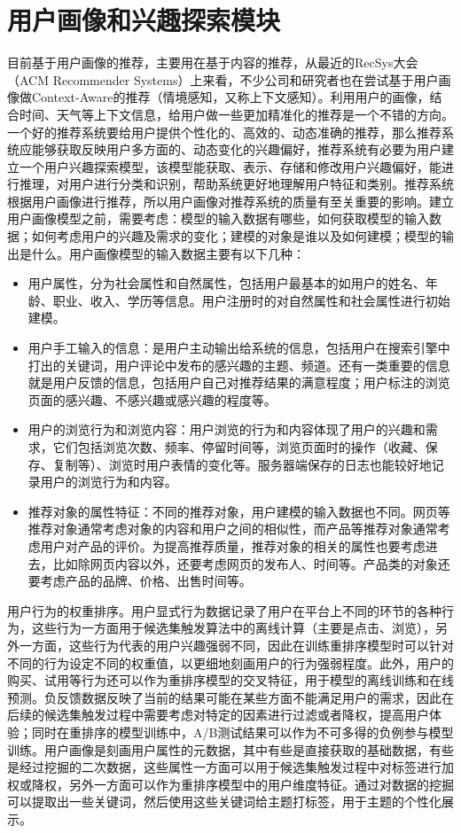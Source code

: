   \section{用户画像和兴趣探索模块}
  目前基于用户画像的推荐，主要用在基于内容的推荐，从最近的RecSys大会（ACM Recommender Systems）上来看，不少公司和研究者也在尝试基于用户画像做Context-Aware的推荐（情境感知，又称上下文感知）。利用用户的画像，结合时间、天气等上下文信息，给用户做一些更加精准化的推荐是一个不错的方向。一个好的推荐系统要给用户提供个性化的、高效的、动态准确的推荐，那么推荐系统应能够获取反映用户多方面的、动态变化的兴趣偏好，推荐系统有必要为用户建立一个用户兴趣探索模型，该模型能获取、表示、存储和修改用户兴趣偏好，能进行推理，对用户进行分类和识别，帮助系统更好地理解用户特征和类别。推荐系统根据用户画像进行推荐，所以用户画像对推荐系统的质量有至关重要的影响。建立用户画像模型之前，需要考虑：模型的输入数据有哪些，如何获取模型的输入数据；如何考虑用户的兴趣及需求的变化；建模的对象是谁以及如何建模；模型的输出是什么。用户画像模型的输入数据主要有以下几种：
  \begin{itemize}
  \item 用户属性，分为社会属性和自然属性，包括用户最基本的如用户的姓名、年龄、职业、收入、学历等信息。用户注册时的对自然属性和社会属性进行初始建模。 
  \item 用户手工输入的信息：是用户主动输出给系统的信息，包括用户在搜索引擎中打出的关键词，用户评论中发布的感兴趣的主题、频道。还有一类重要的信息就是用户反馈的信息，包括用户自己对推荐结果的满意程度；用户标注的浏览页面的感兴趣、不感兴趣或感兴趣的程度等。
  \item 用户的浏览行为和浏览内容：用户浏览的行为和内容体现了用户的兴趣和需求，它们包括浏览次数、频率、停留时间等，浏览页面时的操作（收藏、保存、复制等）、浏览时用户表情的变化等。服务器端保存的日志也能较好地记录用户的浏览行为和内容。
  \item 推荐对象的属性特征：不同的推荐对象，用户建模的输入数据也不同。网页等推荐对象通常考虑对象的内容和用户之间的相似性，而产品等推荐对象通常考虑用户对产品的评价。为提高推荐质量，推荐对象的相关的属性也要考虑进去，比如除网页内容以外，还要考虑网页的发布人、时间等。产品类的对象还要考虑产品的品牌、价格、出售时间等。
  \end{itemize}

  用户行为的权重排序。用户显式行为数据记录了用户在平台上不同的环节的各种行为，这些行为一方面用于候选集触发算法中的离线计算（主要是点击、浏览），另外一方面，这些行为代表的用户兴趣强弱不同，因此在训练重排序模型时可以针对不同的行为设定不同的权重值，以更细地刻画用户的行为强弱程度。此外，用户的购买、试用等行为还可以作为重排序模型的交叉特征，用于模型的离线训练和在线预测。负反馈数据反映了当前的结果可能在某些方面不能满足用户的需求，因此在后续的候选集触发过程中需要考虑对特定的因素进行过滤或者降权，提高用户体验；同时在重排序的模型训练中，A/B测试结果可以作为不可多得的负例参与模型训练。用户画像是刻画用户属性的元数据，其中有些是直接获取的基础数据，有些是经过挖掘的二次数据，这些属性一方面可以用于候选集触发过程中对标签进行加权或降权，另外一方面可以作为重排序模型中的用户维度特征。通过对数据的挖掘可以提取出一些关键词，然后使用这些关键词给主题打标签，用于主题的个性化展示。

